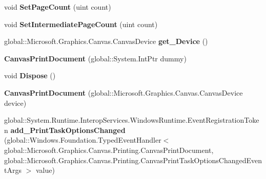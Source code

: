 \begin{DoxyCompactItemize}
\mbox{\label{class_microsoft_1_1_graphics_1_1_canvas_1_1_printing_1_1_canvas_print_document_af703c668de7e2905cf76a064da8dbd29}} 
void {\bfseries Set\+Page\+Count} (uint count)
\item 
\mbox{\label{class_microsoft_1_1_graphics_1_1_canvas_1_1_printing_1_1_canvas_print_document_a570bac56fc10f4180d8e4371d1c2b1ec}} 
void {\bfseries Set\+Intermediate\+Page\+Count} (uint count)
\item 
\mbox{\label{class_microsoft_1_1_graphics_1_1_canvas_1_1_printing_1_1_canvas_print_document_ac10aedd8e487c76596dbcc4eb0804aa4}} 
global\+::\+Microsoft.\+Graphics.\+Canvas.\+Canvas\+Device {\bfseries get\+\_\+\+Device} ()
\item 
\mbox{\label{class_microsoft_1_1_graphics_1_1_canvas_1_1_printing_1_1_canvas_print_document_a7b04c2627b88d8910b67203e8ee65b63}} 
{\bfseries Canvas\+Print\+Document} (global\+::\+System.\+Int\+Ptr dummy)
\item 
\mbox{\label{class_microsoft_1_1_graphics_1_1_canvas_1_1_printing_1_1_canvas_print_document_af8d1422f1d9da5b6eb9b656d9bb4144a}} 
void {\bfseries Dispose} ()
\item 
\mbox{\label{class_microsoft_1_1_graphics_1_1_canvas_1_1_printing_1_1_canvas_print_document_a4e0992b6bdb01a46f6b04c52e8c394cb}} 
{\bfseries Canvas\+Print\+Document} (global\+::\+Microsoft.\+Graphics.\+Canvas.\+Canvas\+Device device)
\item 
\mbox{\label{class_microsoft_1_1_graphics_1_1_canvas_1_1_printing_1_1_canvas_print_document_a5820ace78b04e0ce349872d83c3d7006}} 
global\+::\+System.\+Runtime.\+Interop\+Services.\+Windows\+Runtime.\+Event\+Registration\+Token {\bfseries add\+\_\+\+Print\+Task\+Options\+Changed} (global\+::\+Windows.\+Foundation.\+Typed\+Event\+Handler$<$ global\+::\+Microsoft.\+Graphics.\+Canvas.\+Printing.\+Canvas\+Print\+Document, global\+::\+Microsoft.\+Graphics.\+Canvas.\+Printing.\+Canvas\+Print\+Task\+Options\+Changed\+Event\+Args $>$ value)

\end{DoxyCompactItemize}
